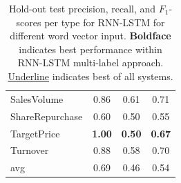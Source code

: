 \documentclass[11pt,a4paper]{article}
\begin{document}
\begin{table}[!htb]
{\begin{tabular}{p{2.8cm} c c c}
			SalesVolume          & 0.86                      & 0.61                      & 0.71                       \\
			ShareRepurchase      & 0.60                      & 0.50                      & 0.55                       \\
			TargetPrice          & \textbf{1.00}             & \textbf{0.50}             & \textbf{0.67}              \\
			Turnover             & 0.88                      & 0.58                      & 0.70                       \\
			\hdashline
			avg                  & 0.69                      & 0.46                      & 0.54                       \\
		\end{tabular}
		\caption{Hold-out test precision, recall, and $F_1$-scores per type for RNN-LSTM for different word vector input. \textbf{Boldface} indicates best performance within RNN-LSTM multi-label approach. \underline{Underline} indicates best of all systems.}
		\label{tab:rnnlstmmultilabel}
	}
\end{table}
\end{document}
